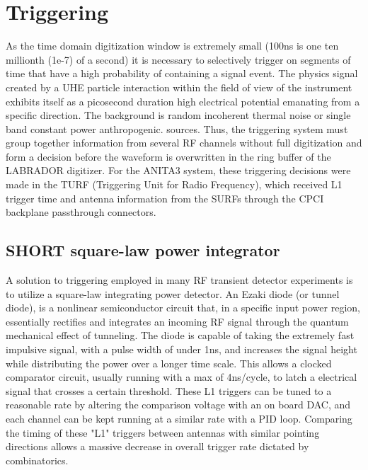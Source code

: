 \section{Triggering}
	As the time domain digitization window is extremely small (100ns is one ten millionth (1e-7) of a second) it is necessary to selectively trigger on segments of time that have a high probability of containing a signal event.  The physics signal created by a UHE particle interaction within the field of view of the instrument exhibits itself as a picosecond duration high electrical potential emanating from a specific direction.  The background is random incoherent thermal noise or single band constant power anthropogenic. sources.  Thus, the triggering system must group together information from several RF channels without full digitization and form a decision before the waveform is overwritten in the ring buffer of the LABRADOR digitizer.  For the ANITA3 system, these triggering decisions were made in the TURF (Triggering Unit for Radio Frequency), which received L1 trigger time and antenna information from the SURFs through the CPCI backplane passthrough connectors.
	\subsection{SHORT square-law power integrator}
		A solution to triggering employed in many RF transient detector experiments is to utilize a square-law integrating power detector.  An Ezaki diode (or tunnel diode), is a nonlinear semiconductor circuit that, in a specific input power region, essentially rectifies and integrates an incoming RF signal through the quantum mechanical effect of tunneling.  The diode is capable of taking the extremely fast impulsive signal, with a pulse width of under 1ns, and increases the signal height while distributing the power over a longer time scale.  This allows a clocked comparator circuit, usually running with a max of 4ns/cycle, to latch a electrical signal that crosses a certain threshold.  These L1 triggers can be tuned to a reasonable rate by altering the comparison voltage with an on board DAC, and each channel can be kept running at a similar rate with a PID loop.  Comparing the timing of these "L1" triggers between antennas with similar pointing directions allows a massive decrease in overall trigger rate dictated by combinatorics.
